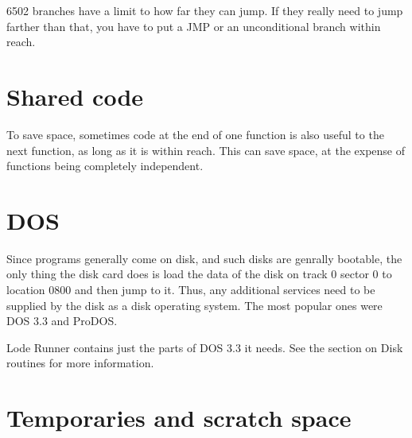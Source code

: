 \documentclass[10pt]{report}
\begin{document}
6502 branches have a limit to how far they can jump. If they really need to
jump farther than that, you have to put a {\Tt{}JMP\nwendquote} or an unconditional branch
within reach.

\section{Shared code}

To save space, sometimes code at the end of one function is also useful to
the next function, as long as it is within reach. This can save space, at
the expense of functions being completely independent.

\section{DOS}

Since programs generally come on disk, and such disks are genrally bootable,
the only thing the disk card does is load the data of the disk on track 0
sector 0 to location {\Tt{}0800\nwendquote} and then jump to it. Thus, any additional
services need to be supplied by the disk as a disk operating system. The most
popular ones were DOS 3.3 and ProDOS.

Lode Runner contains just the parts of DOS 3.3 it needs. See the section on
Disk routines for more information.

\section{Temporaries and scratch space}
\end{document}
